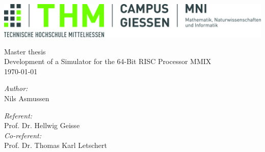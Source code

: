 \begin{titlepage}
\begin{center}

\includegraphics[width=\textwidth]{img/Logo_THM_CG_FB06_4c}\\
\vspace{6cm}

{\huge Master thesis}\\[1cm]
{\huge Development of a Simulator for the 64-Bit RISC Processor MMIX}\\[1cm]
{\large \today}

\vfill

\begin{minipage}{0.45\textwidth}
\begin{flushleft} \large
\emph{Author:}\\
Nils Asmussen\\
\vspace{1cm}
\end{flushleft}
\end{minipage}
\begin{minipage}{0.45\textwidth}
\begin{flushright} \large
\emph{Referent:}\\
Prof. Dr. Hellwig Geisse \\
\emph{Co-referent:}\\
Prof. Dr. Thomas Karl Letschert

\end{flushright}
\end{minipage}

\end{center}
\end{titlepage}
